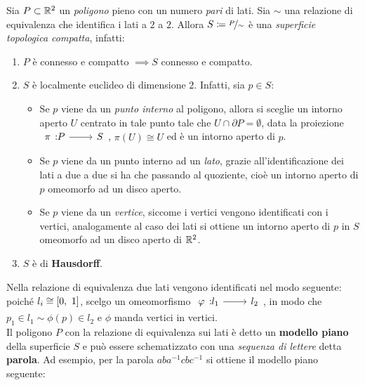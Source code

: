 \begin{observe}
	Sia $P\subset\mathbb{R}^2$ un \textit{poligono} pieno con un numero \textit{pari} di lati. Sia $\sim$ una relazione di equivalenza che identifica i lati a $2$ a $2$. Allora $S\coloneqq\nicefrac{P}{\sim}$ è una \textit{superficie topologica compatta}, infatti:
		\begin{enumerate}
			\item  $P$ è connesso e compatto $\implies S$ connesso e compatto.
			\item $S$ è localmente euclideo di dimensione $2$. Infatti, sia $p\in S$:
			\begin{itemize}
				\item Se $p$ viene da un \textit{punto interno} al poligono, allora si sceglie un intorno aperto $U$ centrato in tale punto tale che $U\cap\partial{P}=\emptyset$, data la proiezione $\funz \pi P S$, $\pi(U)\cong U$ ed è un intorno aperto di $p$.
				\item Se $p$ viene da un punto interno ad un \textit{lato}, grazie all'identificazione dei lati a due a due si ha che passando al quoziente, cioè un intorno aperto di $p$ omeomorfo ad un disco aperto.
				\item Se $p$ viene da un \textit{vertice}, siccome i vertici vengono identificati con i vertici, analogamente al caso dei lati si ottiene un intorno aperto di $p$ in $S$ omeomorfo ad un disco aperto di $\mathbb{R}^2$.
			\end{itemize}
			\item $S$ è di \textbf{Hausdorff}.
		\end{enumerate}
	Nella relazione di equivalenza due lati vengono identificati nel modo seguente: poiché $l_i\cong\left[0,\ 1\right]$, scelgo un omeomorfismo $\funz{\phi}{l_1}{l_2}$, in modo che $p_1\in l_1 \sim \phi(p)\in l_2$ e $\phi$ manda vertici in vertici.\\
	Il poligono $P$ con la relazione di equivalenza sui lati è detto un \textbf{modello piano} della superficie $S$ e può essere schematizzato con una \textit{sequenza di lettere} detta \textbf{parola}. Ad esempio, per la parola $aba^{-1}cbc^{-1}$ si ottiene il modello piano seguente:
		\begin{center}

\end{center}
\end{observe}
